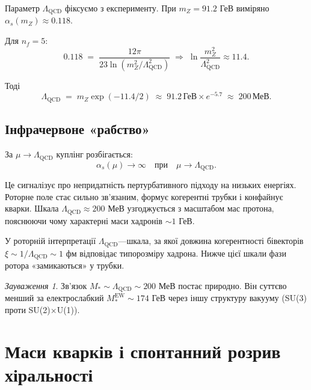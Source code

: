 \documentclass[11pt,a4paper]{article}
\theoremstyle{definition}
\theoremstyle{plain}
\theoremstyle{remark}
\newtheorem{remark}{Зауваження}[section]
\begin{document}
Параметр $\Lambda_{\mathrm{QCD}}$ фіксуємо з експерименту. При $m_Z=91{.}2$ ГеВ виміряно $\alpha_s(m_Z)\approx 0{.}118$.

Для $n_f=5$:
\begin{equation}
0{.}118 \;=\; \frac{12\pi}{23\ln(m_Z^2/\Lambda_{\mathrm{QCD}}^2)} \;\Rightarrow\; \ln\frac{m_Z^2}{\Lambda_{\mathrm{QCD}}^2} \approx 11{.}4.
\end{equation}

Тоді
\begin{equation}
\Lambda_{\mathrm{QCD}} \;=\; m_Z \exp(-11{.}4/2) \;\approx\; 91{.}2\,\text{ГеВ}\times e^{-5{.}7} \;\approx\; \boxed{200\,\text{МеВ}.}
\label{eq:lambda-qcd}
\end{equation}

\subsection{Інфрачервоне «рабство»}

За $\mu\to\Lambda_{\mathrm{QCD}}$ куплінг розбігається:
\begin{equation}
\alpha_s(\mu)\to\infty \quad \text{при}\quad \mu\to\Lambda_{\mathrm{QCD}}.
\end{equation}

Це сигналізує про непридатність пертурбативного підходу на низьких енергіях. Роторне поле стає сильно зв’язаним, формує когерентні трубки і конфайнує кварки. Шкала $\Lambda_{\mathrm{QCD}}\approx 200$ МеВ узгоджується з масштабом мас протона, пояснюючи чому характерні маси хадронів $\sim 1$ ГеВ.

У роторній інтерпретації $\Lambda_{\mathrm{QCD}}$—шкала, за якої довжина когерентності бівекторів $\xi\sim 1/\Lambda_{\mathrm{QCD}}\sim 1$ фм відповідає типорозміру хадрона. Нижче цієї шкали фази ротора «замикаються» у трубки.

\begin{remark}
Зв’язок $M_\ast\sim\Lambda_{\mathrm{QCD}}\sim 200$ МеВ постає природно. Він суттєво менший за електрослабкий $M_\ast^{\mathrm{EW}}\sim 174$ ГеВ через іншу структуру вакууму (SU(3) проти SU(2)$\times$U(1)).
\end{remark}

\vspace{1em}

\section{Маси кварків і спонтанний розрив хіральності}
\label{sec:quark-masses}
\end{document}
